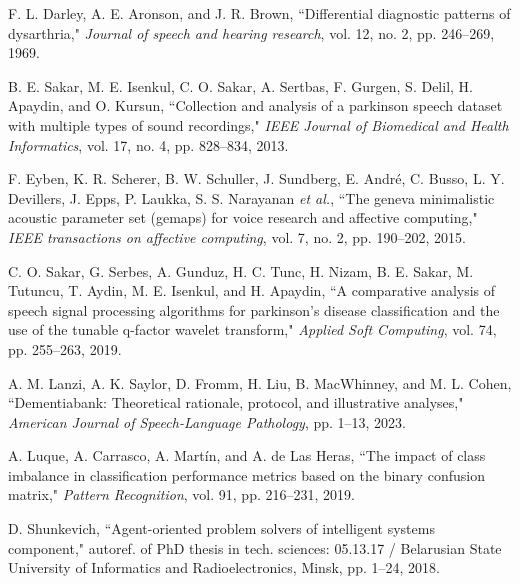 \documentclass{article}
\begin{document}
\begin{multicols}{2}
\raggedleft
\begin{minipage}[t]{0.48\textwidth}


\begin{enumerate}[label={[\arabic*]}, start=8, noitemsep]
{\fontsize{8}{7}\selectfont \item  F. L. Darley, A. E. Aronson, and J. R. Brown, ``Differential diagnostic patterns of dysarthria," \textit{Journal of speech and hearing research}, vol. 12, no. 2, pp. 246--269, 1969.}

{\fontsize{8}{7}\selectfont \item B. E. Sakar, M. E. Isenkul, C. O. Sakar, A. Sertbas, F. Gurgen, S. Delil, H. Apaydin, and O. Kursun, ``Collection and analysis of a parkinson speech dataset with multiple types of sound recordings," \textit{IEEE Journal of Biomedical and Health Informatics}, vol. 17, no. 4, pp. 828--834, 2013.}

{\fontsize{8}{7}\selectfont \item F. Eyben, K. R. Scherer, B. W. Schuller, J. Sundberg, E. André, C. Busso, L. Y. Devillers, J. Epps, P. Laukka, S. S. Narayanan \textit{et al.}, ``The geneva minimalistic acoustic parameter set (gemaps) for voice research and affective computing," \textit{IEEE transactions on affective computing}, vol. 7, no. 2, pp. 190--202, 2015.}

{\fontsize{8}{7}\selectfont \item C. O. Sakar, G. Serbes, A. Gunduz, H. C. Tunc, H. Nizam, B. E. Sakar, M. Tutuncu, T. Aydin, M. E. Isenkul, and H. Apaydin, ``A comparative analysis of speech signal processing algorithms for parkinson's disease classification and the use of the tunable q-factor wavelet transform," \textit{Applied Soft Computing}, vol. 74, pp. 255--263, 2019.}

{\fontsize{8}{7}\selectfont \item A. M. Lanzi, A. K. Saylor, D. Fromm, H. Liu, B. MacWhinney, and M. L. Cohen, ``Dementiabank: Theoretical rationale, protocol, and illustrative analyses," \textit{American Journal of Speech-Language Pathology}, pp. 1--13, 2023.}

{\fontsize{8}{7}\selectfont \item A. Luque, A. Carrasco, A. Martín, and A. de Las Heras, ``The impact of class imbalance in classification performance metrics based on the binary confusion matrix," \textit{Pattern Recognition}, vol. 91, pp. 216--231, 2019.}

{\fontsize{8}{7}\selectfont \item D. Shunkevich, ``Agent-oriented problem solvers of intelligent systems component," autoref. of PhD thesis in tech. sciences: 05.13.17 / Belarusian State University of Informatics and Radioelectronics, Minsk, pp. 1--24, 2018.}
\end{enumerate}


\end{minipage}
\end{multicols}
\end{document}
